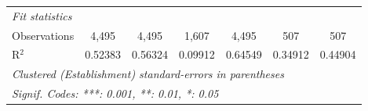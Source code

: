 \begin{tabular}{lcccccc}
   \midrule
   \emph{Fit statistics}\\
   Observations         & 4,495        & 4,495         & 1,607         & 4,495            & 507              & 507\\  
   R$^2$                & 0.52383      & 0.56324       & 0.09912       & 0.64549          & 0.34912          & 0.44904\\  
   \midrule \midrule
   \multicolumn{7}{l}{\emph{Clustered (Establishment) standard-errors in parentheses}}\\
   \multicolumn{7}{l}{\emph{Signif. Codes: ***: 0.001, **: 0.01, *: 0.05}}\\
\end{tabular}
\par\endgroup


